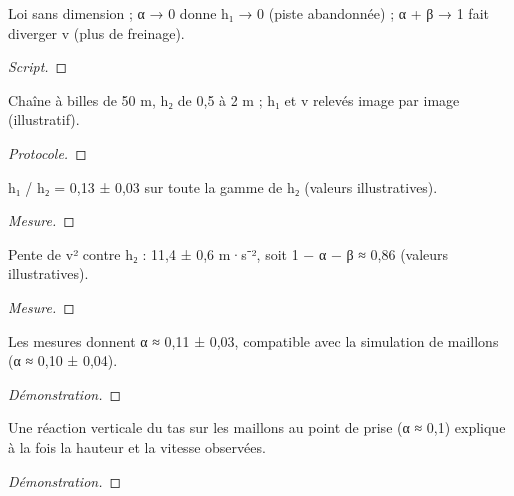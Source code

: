 \begin{calcul}\label{calc_dim}
Loi sans dimension ; α → 0 donne h₁ → 0 (piste abandonnée) ; α + β → 1 fait diverger v (plus de freinage).
\end{calcul}
\begin{proof}[Script]
\end{proof}

\begin{experience}\label{exp_film}
Chaîne à billes de 50 m, h₂ de 0,5 à 2 m ; h₁ et v relevés image par image (illustratif).
\end{experience}
\begin{proof}[Protocole]
\end{proof}

\begin{observation}[h₁ proportionnelle à h₂]\label{obs_lineaire}
h₁ / h₂ = 0,13 ± 0,03 sur toute la gamme de h₂ (valeurs illustratives).
\end{observation}
\begin{proof}[Mesure]
\end{proof}

\begin{observation}[v² proportionnelle à h₂]\label{obs_v}
Pente de v² contre h₂ : 11,4 ± 0,6 m·s⁻², soit 1 − α − β ≈ 0,86 (valeurs illustratives).
\end{observation}
\begin{proof}[Mesure]
\end{proof}

\begin{resultat}[Estimation de α]\label{res_alpha}
Les mesures donnent α ≈ 0,11 ± 0,03, compatible avec la simulation de maillons (α ≈ 0,10 ± 0,04).
\end{resultat}
\begin{proof}[Démonstration]
\end{proof}

\begin{resultat}\label{res_explication}
Une réaction verticale du tas sur les maillons au point de prise (α ≈ 0,1) explique à la fois la hauteur et la vitesse observées.
\end{resultat}
\begin{proof}[Démonstration]
\end{proof}
